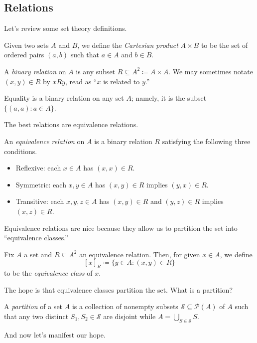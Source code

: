 \subsection{Relations}
Let's review some set theory definitions.
\begin{definition}
	Given two sets $A$ and $B$, we define the \textit{Cartesian product} $A\times B$ to be the set of ordered pairs $(a,b)$ such that $a\in A$ and $b\in B$.
\end{definition}
\begin{definition}
	A \textit{binary relation} on $A$ is any subset $R\subseteq A^2\coloneqq A\times A$. We may sometimes notate $(x,y)\in R$ by $xRy$, read as ``$x$ is related to $y$.''
\end{definition}
\begin{example}
	Equality is a binary relation on any set $A$; namely, it is the subset $\{(a,a):a\in A\}$.
\end{example}
The best relations are equivalence relations.
\begin{definition}
	An \textit{equivalence relation} on $A$ is a binary relation $R$ satisfying the following three conditions.
	\begin{itemize}
		\item Reflexive: each $x\in A$ has $(x,x)\in R$.
		\item Symmetric: each $x,y\in A$ has $(x,y)\in R$ implies $(y,x)\in R$.
		\item Transitive: each $x,y,z\in A$ has $(x,y)\in R$ and $(y,z)\in R$ implies $(x,z)\in R$.
	\end{itemize}
\end{definition}
Equivalence relations are nice because they allow us to partition the set into ``equivalence classes.''
\begin{defi}
	Fix $A$ a set and $R\subseteq A^2$ an equivalence relation. Then, for given $x\in A$, we define
	\[[x]_R\coloneqq \{y\in A:(x,y)\in R\}\]
	to be the \textit{equivalence class} of $x$.
\end{defi}
The hope is that equivalence classes partition the set. What is a partition?
\begin{definition}[Parition]
	A \textit{partition} of a set $A$ is a collection of nonempty subsets $\mathcal S\subseteq\mathcal P(A)$ of $A$ such that any two distinct $S_1,S_2\in\mathcal S$ are disjoint while $A=\bigcup_{S\in\mathcal S}S$.
\end{definition}
And now let's manifest our hope.

